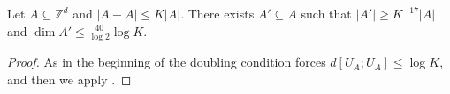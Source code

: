 \begin{theorem}\label{weak-pfr-int}\leanok
Let $A\subseteq \mathbb{Z}^d$ and $\lvert A-A\rvert\leq K\lvert A\rvert$.
There exists $A'\subseteq A$ such that $\lvert A'\rvert \geq K^{-17}\lvert
A\rvert$ and $\dim A' \leq \frac{40}{\log 2}\log K$.
\end{theorem}
\begin{proof}\leanok
As in the beginning of  the doubling condition forces $d[U_A;U_A]\leq \log K$, and then we apply .
\end{proof}
